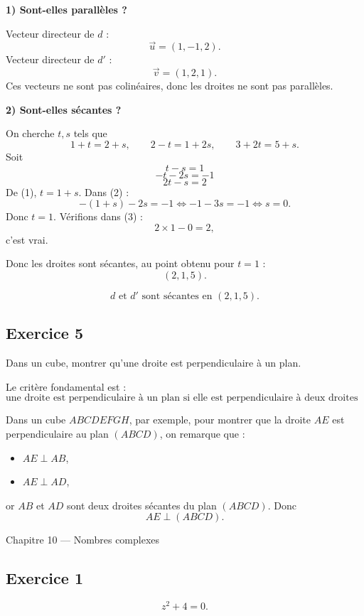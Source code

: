 \documentclass[11pt,a4paper]{article}
\begin{document}
\textbf{1) Sont-elles parallèles ?}

Vecteur directeur de \(d\) :
\[
\vec u=(1,-1,2).
\]
Vecteur directeur de \(d'\) :
\[
\vec v=(1,2,1).
\]
Ces vecteurs ne sont pas colinéaires, donc les droites ne sont pas parallèles.

\textbf{2) Sont-elles sécantes ?}

On cherche \(t,s\) tels que
\[
1+t=2+s,\qquad 2-t=1+2s,\qquad 3+2t=5+s.
\]
Soit
\[
t-s=1 \tag{1}
\]
\[
-t-2s=-1 \tag{2}
\]
\[
2t-s=2 \tag{3}
\]
De (1), \(t=1+s\).  
Dans (2) :
\[
-(1+s)-2s=-1
\iff -1-3s=-1
\iff s=0.
\]
Donc \(t=1\).  
Vérifions dans (3) :
\[
2\times 1-0=2,
\]
c'est vrai.

Donc les droites sont sécantes, au point obtenu pour \(t=1\) :
\[
(2,1,5).
\]

\[
\boxed{d \text{ et } d' \text{ sont sécantes en } (2,1,5).}
\]

\subsection*{Exercice 5}
Dans un cube, montrer qu'une droite est perpendiculaire à un plan.

\begin{methodebox}
Le critère fondamental est :
\[
\text{une droite est perpendiculaire à un plan si elle est perpendiculaire à deux droites sécantes de ce plan.}
\]
\end{methodebox}

Dans un cube \(ABCDEFGH\), par exemple, pour montrer que la droite \(AE\) est perpendiculaire au plan \((ABCD)\), on remarque que :
\begin{itemize}
    \item \(AE\perp AB\),
    \item \(AE\perp AD\),
\end{itemize}
or \(AB\) et \(AD\) sont deux droites sécantes du plan \((ABCD)\).  
Donc
\[
\boxed{AE\perp (ABCD).}
\]

\begin{chapitrebox}{Chapitre 10 --- Nombres complexes}
\end{chapitrebox}

\subsection*{Exercice 1}
\[
z^2+4=0.
\]
\end{document}
